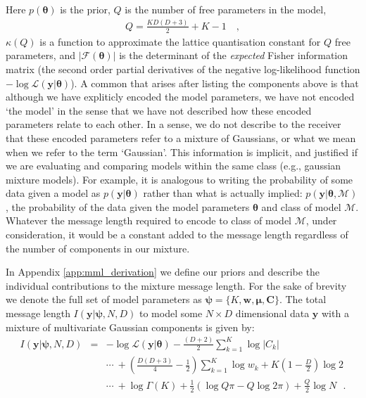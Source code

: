 \documentclass{elsarticle}
\newcommand{\vect}[1]{\boldsymbol{\mathbf{#1}}}
\renewcommand{\vec}[1]{\vect{#1}}
\def\cov{C}
\def\veccov{\vect{\cov}}
\def\vecmean{\vect{\mu}}
\def\vectheta{\vect{\theta}}
\def\weight{w}
\def\datum{y}
\def\data{\vect{\datum}}
\def\likelihood{\mathcal{L}}
\newcommand{\fisher}[1]{\mathcal{F}\left(#1\right)}
\newcommand{\prior}[1]{p\left(#1\right)}
\begin{document}
Here $\prior{\vec{\theta}}$ is the prior, $Q$ is the number of free parameters
in the model,
\begin{eqnarray}
	Q = \frac{KD(D+3)}{2} + K - 1 \quad ,
\end{eqnarray}
\noindent{}$\kappa(Q)$ is a function to approximate the lattice quantisation
constant for $Q$ free parameters\cite{ConwaySloane1984}, and $|\fisher{\vec{\theta}}|$
is the determinant of the \emph{expected} Fisher information matrix (the second
order partial derivatives of the negative log-likelihood function $-\log\likelihood\left(\vec{\data}|\vec{\theta}\right)$).
A common that arises after listing the components above is that although we
have expliticly encoded the model parameters, we have not encoded `the model'
in the sense that we have not described how these encoded parameters relate 
to each other. In a sense, we do not describe to the receiver that these
encoded parameters refer to a mixture of Gaussians, or what we mean when we
refer to the term `Gaussian'. This information is implicit, and justified
if we are evaluating and comparing models within the same class (e.g., gaussian 
mixture models). For example, it is analogous to writing the probability of
some data given a model as $p(\vec{\data}|\vec{\theta})$ rather than what is 
actually implied: $p(\vec{\data}|\vec{\theta},\vec{\mathcal{M}})$, the 
probability of the data given the model parameters $\vec{\theta}$ and class of 
model $\vec{\mathcal{M}}$. Whatever the message length required to encode to 
class of model $\vec{\mathcal{M}}$, under consideration, it would be a constant 
added to the message length regardless of the number of components in our mixture. 

In Appendix \ref{app:mml_derivation} we define our priors and describe the 
individual contributions to the mixture message length. For the sake of brevity we
denote the full set of model parameters as $\vec{\psi} = \{K, \vec{\weight}, \vecmean, \veccov\}$.
The total message length $I(\vec{\data}|\vec{\psi}, N, D)$ to model some $N \times D$ dimensional data $\vec{\data}$ with a mixture of multivariate Gaussian components is given by:
\begin{eqnarray}
	I(\vec{\data}|\vec{\psi}, N, D) &=& -\log\mathcal{L}\left(\vec{\data}|\vectheta\right) - \frac{(D + 2)}{2}\sum_{k=1}^{K}\log{|{\cov}_k|} \nonumber \\
	&& \cdots\ + \left(\frac{D(D+3)}{4} - \frac{1}{2}\right)\sum_{k=1}^{K}\log{\weight_k} + K\left(1-\frac{D}{2}\right)\log{2} \nonumber \\ && \cdots\ + \log\Gamma{(K)} + \frac{1}{2}\left(\log{Q\pi} - Q\log{2\pi}\right) + \frac{Q}{2}\log{N} \,\,\,\, . 
	\label{eq:objective_function}
\end{eqnarray}
\end{document}
